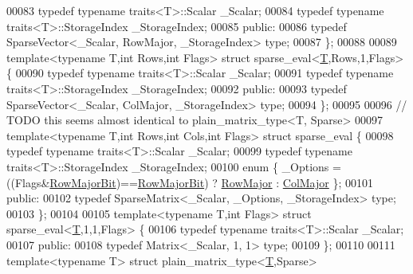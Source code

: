 \begin{DoxyCode}
00083     \textcolor{keyword}{typedef} \textcolor{keyword}{typename} traits<T>::Scalar \_Scalar;
00084     \textcolor{keyword}{typedef} \textcolor{keyword}{typename} traits<T>::StorageIndex \_StorageIndex;
00085   \textcolor{keyword}{public}:
00086     \textcolor{keyword}{typedef} SparseVector<\_Scalar, RowMajor, \_StorageIndex> type;
00087 \};
00088 
00089 \textcolor{keyword}{template}<\textcolor{keyword}{typename} T,\textcolor{keywordtype}{int} Rows,\textcolor{keywordtype}{int} Flags> \textcolor{keyword}{struct }sparse\_eval<\hyperlink{group___sparse_core___module_class_eigen_1_1_triplet}{T},Rows,1,Flags> \{
00090     \textcolor{keyword}{typedef} \textcolor{keyword}{typename} traits<T>::Scalar \_Scalar;
00091     \textcolor{keyword}{typedef} \textcolor{keyword}{typename} traits<T>::StorageIndex \_StorageIndex;
00092   \textcolor{keyword}{public}:
00093     \textcolor{keyword}{typedef} SparseVector<\_Scalar, ColMajor, \_StorageIndex> type;
00094 \};
00095 
00096 \textcolor{comment}{// TODO this seems almost identical to plain\_matrix\_type<T, Sparse>}
00097 \textcolor{keyword}{template}<\textcolor{keyword}{typename} T,\textcolor{keywordtype}{int} Rows,\textcolor{keywordtype}{int} Cols,\textcolor{keywordtype}{int} Flags> \textcolor{keyword}{struct }sparse\_eval \{
00098     \textcolor{keyword}{typedef} \textcolor{keyword}{typename} traits<T>::Scalar \_Scalar;
00099     \textcolor{keyword}{typedef} \textcolor{keyword}{typename} traits<T>::StorageIndex \_StorageIndex;
00100     \textcolor{keyword}{enum} \{ \_Options = ((Flags&\hyperlink{group__flags_gae4f56c2a60bbe4bd2e44c5b19cbe8762}{RowMajorBit})==\hyperlink{group__flags_gae4f56c2a60bbe4bd2e44c5b19cbe8762}{RowMajorBit}) ? 
      \hyperlink{group__enums_ggaacded1a18ae58b0f554751f6cdf9eb13acfcde9cd8677c5f7caf6bd603666aae3}{RowMajor} : \hyperlink{group__enums_ggaacded1a18ae58b0f554751f6cdf9eb13a0cbd4bdd0abcfc0224c5fcb5e4f6669a}{ColMajor} \};
00101   \textcolor{keyword}{public}:
00102     \textcolor{keyword}{typedef} SparseMatrix<\_Scalar, \_Options, \_StorageIndex> type;
00103 \};
00104 
00105 \textcolor{keyword}{template}<\textcolor{keyword}{typename} T,\textcolor{keywordtype}{int} Flags> \textcolor{keyword}{struct }sparse\_eval<\hyperlink{group___sparse_core___module_class_eigen_1_1_triplet}{T},1,1,Flags> \{
00106     \textcolor{keyword}{typedef} \textcolor{keyword}{typename} traits<T>::Scalar \_Scalar;
00107   \textcolor{keyword}{public}:
00108     \textcolor{keyword}{typedef} Matrix<\_Scalar, 1, 1> type;
00109 \};
00110 
00111 \textcolor{keyword}{template}<\textcolor{keyword}{typename} T> \textcolor{keyword}{struct }plain\_matrix\_type<\hyperlink{group___sparse_core___module_class_eigen_1_1_triplet}{T},Sparse>

\end{DoxyCode}

